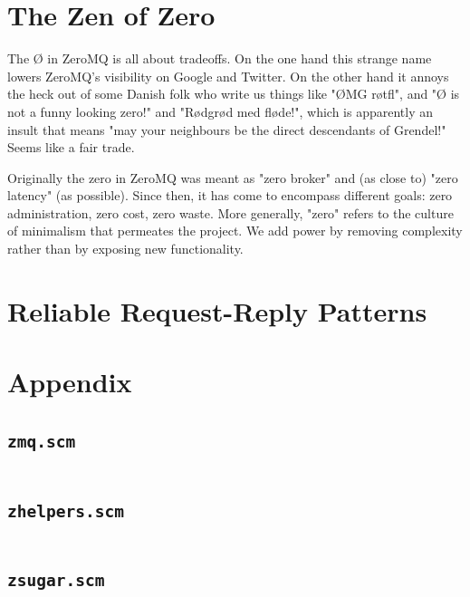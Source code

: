 \documentclass[a4paper,12pt]{article}
\begin{document}
\section*{The Zen of Zero}

The Ø in ZeroMQ is all about tradeoffs. On the one hand this strange name
lowers ZeroMQ's visibility on Google and Twitter. On the other hand it annoys
the heck out of some Danish folk who write us things like "ØMG røtfl", and "Ø
is not a funny looking zero!" and "Rødgrød med fløde!", which is apparently an
insult that means "may your neighbours be the direct descendants of Grendel!"
Seems like a fair trade.

Originally the zero in ZeroMQ was meant as "zero broker" and (as close to)
"zero latency" (as possible). Since then, it has come to encompass different
goals: zero administration, zero cost, zero waste. More generally, "zero"
refers to the culture of minimalism that permeates the project. We add power by
removing complexity rather than by exposing new
functionality.

\tableofcontents



\section{Reliable Request-Reply Patterns}
\label{sec:Reliable:Request:Reply:Patterns}

\section{Appendix}

\subsection{\texttt{zmq.scm}}
\inputminted[baselinestretch=0.8,stripnl=false]{scheme}{../src/zmq.scm}

\subsection{\texttt{zhelpers.scm}}
\label{sec:zhelpers:scm}
\inputminted[baselinestretch=0.8,stripnl=false]{scheme}{../src/zhelpers.scm}

\subsection{\texttt{zsugar.scm}}
\inputminted[baselinestretch=0.8,stripnl=false]{scheme}{../src/zsugar.scm}




\end{document}

